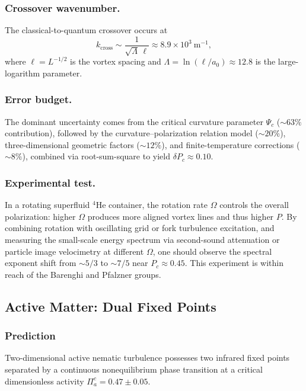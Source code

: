 \subsubsection*{Crossover wavenumber.}
The classical-to-quantum crossover occurs at
\begin{equation}
k_{\mathrm{cross}} \sim \frac{1}{\sqrt{\Lambda}\,\ell} \approx 8.9\times 10^3~\mathrm{m}^{-1},
\end{equation}
where $\ell=L^{-1/2}$ is the vortex spacing and $\Lambda=\ln(\ell/a_0)\approx 12.8$ is the large-logarithm parameter.

\subsubsection*{Error budget.}
The dominant uncertainty comes from the critical curvature parameter $\Psi_c$ (${\sim}63\%$ contribution), followed by the curvature--polarization relation model (${\sim}20\%$), three-dimensional geometric factors (${\sim}12\%$), and finite-temperature corrections (${\sim}8\%$), combined via root-sum-square to yield $\delta P_c\approx 0.10$.

\subsubsection*{Experimental test.}
In a rotating superfluid $^4$He container, the rotation rate $\Omega$ controls the overall polarization: higher $\Omega$ produces more aligned vortex lines and thus higher $P$. By combining rotation with oscillating grid or fork turbulence excitation, and measuring the small-scale energy spectrum via second-sound attenuation or particle image velocimetry at different $\Omega$, one should observe the spectral exponent shift from ${\sim}5/3$ to ${\sim}7/5$ near $P_c\approx 0.45$. This experiment is within reach of the Barenghi and Pfalzner groups.

\subsection{Active Matter: Dual Fixed Points\label{subsec:pred_active}}

\subsubsection*{Prediction}
Two-dimensional active nematic turbulence possesses two infrared fixed points separated by a continuous nonequilibrium phase transition at a critical dimensionless activity $\Pi_a^c = 0.47 \pm 0.05$.

